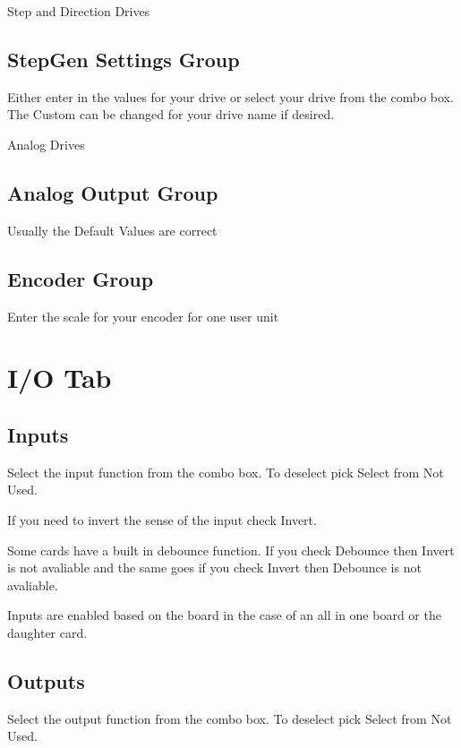 \documentclass[letterpaper,10pt,english,openany,oneside]{sphinxmanual}
\begin{document}
Step and Direction Drives



\section{StepGen Settings Group}
\label{\detokenize{axes:stepgen-settings-group}}
Either enter in the values for your drive or select your drive from the
combo box. The Custom can be changed for your drive name if desired.

Analog Drives



\section{Analog Output Group}
\label{\detokenize{axes:analog-output-group}}
Usually the Default Values are correct


\section{Encoder Group}
\label{\detokenize{axes:encoder-group}}
Enter the scale for your encoder for one user unit


\chapter{I/O Tab}
\label{\detokenize{io:i-o-tab}}\label{\detokenize{io::doc}}


\section{Inputs}
\label{\detokenize{io:inputs}}
Select the input function from the combo box. To deselect pick Select
from Not Used.

If you need to invert the sense of the input check Invert.

Some cards have a built in debounce function. If you check Debounce then
Invert is not avaliable and the same goes if you check Invert then
Debounce is not avaliable.

Inputs are enabled based on the board in the case of an all in one board
or the daughter card.


\section{Outputs}
\label{\detokenize{io:outputs}}
Select the output function from the combo box.  To deselect pick Select
from Not Used.



\renewcommand{\indexname}{Index}
\printindex
\end{document}

